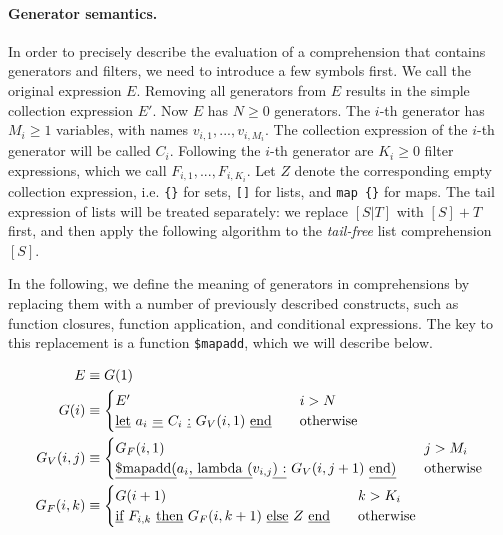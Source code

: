 
\paragraph{Generator semantics.}
In order to precisely describe the evaluation of a comprehension that
contains generators and filters, we need to introduce a few symbols
first. We call the original expression $E$. Removing all
generators from $E$ results in the simple collection expression
$E'$. Now $E$ has $N \geq 0$ generators. The $i$-th generator has
$M_i \geq 1$ variables, with names $v_{i,1}, ..., v_{i, {M_i}}$. The
collection expression of the $i$-th generator will be called $C_i$.
Following the $i$-th generator are $K_i \geq 0$ filter expressions,
which we call $F_{i, 1}, ..., F_{i, {K_i}}$. Let $Z$ denote the
corresponding empty collection expression, i.e. {\tt \{\}} for sets,
{\tt []} for lists, and {\tt map \{\}} for maps. The tail expression
of lists will be treated separately: we replace $[S | T]$ with $[S] +
T$ first, and then apply the following algorithm to the {\em tail-free} list
comprehension $[S]$.

In the following, we define the meaning of generators in
comprehensions by replacing them with a number of previously described
constructs, such as function closures, function application, and
conditional expressions. The key to this replacement is a function
{\tt \$mapadd}, which we will describe below.

\newcommand{\lit}[1]{\text{\underline{#1}}}

\begin{align*}
  E & \equiv G(1) \\
  G(i) & \equiv 
  \begin{cases}
    E' &\quad i > N\\
    \lit{let}~a_i ~\lit{=} ~C_i ~\lit{:}~
    G_V(i, 1) ~\lit{end} &\quad \text{otherwise} 
  \end{cases}\\
  G_V(i, j) &\equiv
  \begin{cases}
    G_F(i, 1) &\quad j > M_i \\
    \lit{\$mapadd(}a_i\lit{, lambda (}v_{i, j}\lit{) :}~G_V(i, j +
    1)~\lit{end)} &\quad \text{otherwise}
  \end{cases}\\
  G_F(i, k) &\equiv
  \begin{cases}
    G(i+1) &\quad k > K_i\\
    \lit{if}~F_{i, k}~\lit{then}~G_F(i, k+1)~\lit{else}~Z~\lit{end} &\quad\text{otherwise}
  \end{cases}
\end{align*}

